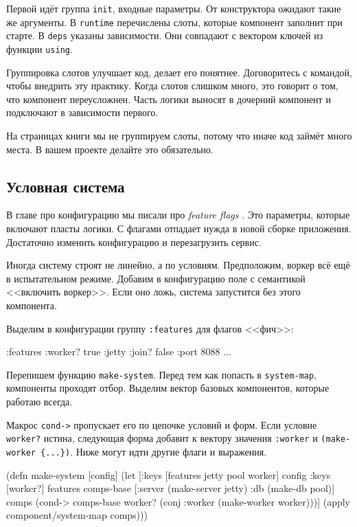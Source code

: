Первой идёт группа \verb|init|, входные параметры. От конструктора ожидают
такие же аргументы. В \verb|runtime| перечислены слоты, которые компонент
заполнит при старте. В \verb|deps| указаны зависимости. Они совпадают с
вектором ключей из функции \verb|using|.

Группировка слотов улучшает код, делает его понятнее. Договоритесь с командой,
чтобы внедрить эту практику. Когда слотов слишком много, это говорит о том, что
компонент переусложнен. Часть логики выносят в дочерний компонент и подключают в
зависимости первого.

На страницах книги мы не группируем слоты, потому что иначе код займёт много
места. В вашем проекте делайте это обязательно.

\subsection{Условная система}


В главе про конфигурацию мы писали про \emph{feature flags} .
Это параметры, которые включают пласты логики. С флагами отпадает нужда в новой сборке
приложения. Достаточно изменить конфигурацию и перезагрузить сервис.

Иногда систему строят не линейно, а по условиям. Предположим, воркер
всё ещё в испытательном режиме. Добавим в конфигурацию поле с семантикой
<<включить воркер>>. Если оно ложь, система запустится без этого компонента.


Выделим в конфигурации группу \verb|:features| для флагов <<фич>>:

\begin{english}
  \begin{clojure}
{:features {:worker? true}
 :jetty {:join? false :port 8088}
 ...}
  \end{clojure}
\end{english}

Перепишем функцию \verb|make-system|. Перед тем как попасть в
\verb|system-map|, компоненты проходят отбор. Выделим вектор базовых
компонентов, которые работаю всегда.

Макрос \verb|cond->| пропускает его по цепочке условий и форм. Если условие
\verb|worker?| истина, следующая форма добавит к вектору значения
\verb|:worker| и \verb|(make-worker {...})|. Ниже могут идти другие флаги и
выражения.

\begin{english}
  \begin{clojure}
(defn make-system [config]
  (let [{:keys [features jetty pool worker]} config
        {:keys [worker?]} features
        comps-base [:server (make-server jetty)
                    :db (make-db pool)]
        comps (cond-> comps-base
                worker?
                (conj :worker (make-worker worker)))]
    (apply component/system-map comps)))
  \end{clojure}
\end{english}

